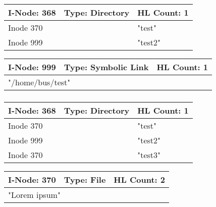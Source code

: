 \documentclass[a4paper, 11pt]{article}
\begin{document}
    \subsubsection{}
        \begin{table}[h!]
            \begin{tabular}{|l|l|l|}
            \hline
            I-Node: 368   & Type: Directory  & HL Count: 1 \\ \hline
            \multicolumn{2}{|l|}{Inode 370} & "test"      \\ \hline
            \multicolumn{2}{|l|}{Inode 999} & "test2"     \\ \hline
            \end{tabular}
            \end{table}
            \begin{table}[h!]
                \begin{tabular}{|l|l|l|}
                \hline
                I-Node: 999 & Type: Symbolic Link & HL Count: 1 \\ \hline
                \multicolumn{3}{|l|}{"/home/bus/test"}         \\ \hline
                \end{tabular}
                \end{table}
        \subsubsection{}
        \begin{table}[h!]
            \begin{tabular}{|l|l|l|}
            \hline
            I-Node: 368   & Type: Directory  & HL Count: 1 \\ \hline
            \multicolumn{2}{|l|}{Inode 370} & "test"      \\ \hline
            \multicolumn{2}{|l|}{Inode 999} & "test2"     \\ \hline
            \multicolumn{2}{|l|}{Inode 370} & "test3"     \\ \hline
            \end{tabular}
            \end{table}
            \begin{table}[h!]
                \begin{tabular}{|l|l|l|}
                \hline
                I-Node: 370 & Type: File & HL Count: 2 \\ \hline
                \multicolumn{3}{|l|}{"Lorem ipsum"}         \\ \hline
                \end{tabular}
                \end{table}
\end{document}
